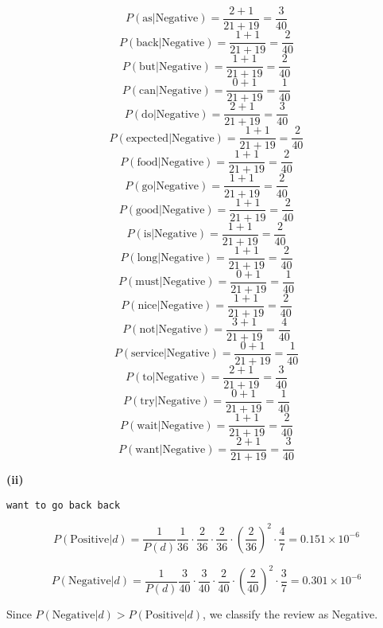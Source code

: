 \documentclass[11pt,a4paper]{report}
\begin{document}
\begin{multicols*}{2}
$$ P(\text{as} | \text{Negative} ) = \frac{2 + 1}{21 + 19} = \frac{3}{40}$$
$$ P(\text{back} | \text{Negative} ) = \frac{1 + 1}{21 + 19} = \frac{2}{40}$$
$$ P(\text{but} | \text{Negative} ) = \frac{1 + 1}{21 + 19} = \frac{2}{40}$$
$$ P(\text{can} | \text{Negative} ) = \frac{0 + 1}{21 + 19} = \frac{1}{40}$$
$$ P(\text{do} | \text{Negative} ) = \frac{2 + 1}{21 + 19} = \frac{3}{40}$$
$$ P(\text{expected} | \text{Negative} ) = \frac{1 + 1}{21 + 19} = \frac{2}{40}$$
$$ P(\text{food} | \text{Negative} ) = \frac{1 + 1}{21 + 19} = \frac{2}{40}$$
$$ P(\text{go} | \text{Negative} ) = \frac{1 + 1}{21 + 19} = \frac{2}{40}$$
$$ P(\text{good} | \text{Negative} ) = \frac{1 + 1}{21 + 19} = \frac{2}{40}$$
$$ P(\text{is} | \text{Negative} ) = \frac{1 + 1}{21 + 19} = \frac{2}{40}$$
$$ P(\text{long} | \text{Negative} ) = \frac{1 + 1}{21 + 19} = \frac{2}{40}$$
$$ P(\text{must} | \text{Negative} ) = \frac{0 + 1}{21 + 19} = \frac{1}{40}$$
$$ P(\text{nice} | \text{Negative} ) = \frac{1 + 1}{21 + 19} = \frac{2}{40}$$
$$ P(\text{not} | \text{Negative} ) = \frac{3 + 1}{21 + 19} = \frac{4}{40}$$
$$ P(\text{service} | \text{Negative} ) = \frac{0 + 1}{21 + 19} = \frac{1}{40}$$
$$ P(\text{to} | \text{Negative} ) = \frac{2 + 1}{21 + 19} = \frac{3}{40}$$
$$ P(\text{try} | \text{Negative} ) = \frac{0 + 1}{21 + 19} = \frac{1}{40}$$
$$ P(\text{wait} | \text{Negative} ) = \frac{1 + 1}{21 + 19} = \frac{2}{40}$$
$$ P(\text{want} | \text{Negative} ) = \frac{2 + 1}{21 + 19} = \frac{3}{40}$$

\noindent \textbf{(ii)}
\begin{center}\verb|want to go back back|\end{center}

\scriptsize
$$P(\text{Positive}|d) = \frac{1}{P(d)} \frac{1}{36} \cdot \frac{2}{36} \cdot \frac{2}{36} \cdot (\frac{2}{36})^2 \cdot \frac{4}{7}= 0.151 \times 10^{-6}$$

$$P(\text{Negative}|d) = \frac{1}{P(d)} \frac{3}{40} \cdot \frac{3}{40} \cdot \frac{2}{40} \cdot (\frac{2}{40})^2  \cdot \frac{3}{7}= 0.301 \times 10^{-6}$$
\normalsize

\noindent Since $P(\text{Negative}|d) > P(\text{Positive}|d)$, we classify the review as Negative.\\


\end{multicols*}
\end{document}
